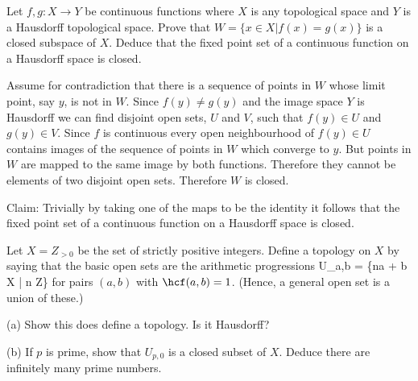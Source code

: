 \begin{problem}
Let $f, g : X \to Y$ be continuous functions where $X$ is any topological space and $Y$ is a Hausdorff topological space. Prove that $W = \{x \in X | f(x) = g(x)\}$ is a closed subspace of $X$. Deduce that the fixed point set of a continuous function on a Hausdorff space is closed.
\end{problem}

\begin{solution}[\bf Solution.]
Assume for contradiction that there is a sequence of points in $W$ whose limit point, say $y$, is not in $W$. Since $f(y) \neq g(y)$ and the image space $Y$ is Hausdorff we can find disjoint open sets, $U$ and $V$, such that $f(y)\in U$ and $g(y)\in V$. Since $f$ is continuous every open neighbourhood of $f(y)\in U$ contains images of the sequence of points in $W$ which converge to $y$. But points in $W$ are mapped to the same image by both functions. Therefore they cannot be elements of two disjoint open sets. Therefore $W$ is closed.

Claim: Trivially by taking one of the maps to be the identity it follows that the fixed point set of a continuous function on a Hausdorff space is closed.
\end{solution}


\begin{problem}
Let $X = Z_{>0}$ be the set of strictly positive integers. Define a topology on $X$ by saying that the basic open sets are the arithmetic progressions
\be
U_{a,b} = \{na + b \in X | n \in Z\}
\ee
for pairs $(a, b)$ with $\hcf(a, b) = 1$. (Hence, a general open set is a union of these.)
\ben
\item [(a)] Show this does define a topology. Is it Hausdorff?
\item [(b)] If $p$ is prime, show that $U_{p,0}$ is a closed subset of $X$. Deduce there are infinitely many prime numbers.
\een
\end{problem}

